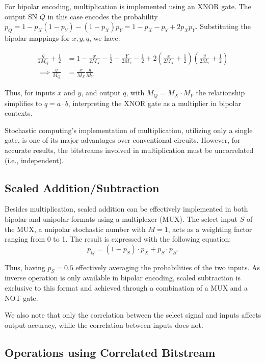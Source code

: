 For bipolar encoding, multiplication is implemented using an XNOR gate. The output SN $Q $ in this case encodes the probability $p_Q  = 1 - p_X (1-p_Y) - (1-p_X) p_Y = 1 - p_X - p_Y + 2p_Xp_Y$. Substituting the bipolar mappings for $x, y, q$, we have: 

$$\begin{aligned} 
\frac{q}{2M_Q} + \frac{1}{2} &= 1 - \frac{x}{2M_X} - \frac{1}{2} - \frac{Y}{2M_Y} - \frac{1}{2} + 2\left(\frac{x}{2M_X} + \frac{1}{2}\right) \left(\frac{y}{2M_Y} + \frac{1}{2}\right) \\
\implies \frac{q}{M_Q} &= \frac{x}{M_X} \frac{y}{M_Y}
\end{aligned}$$

Thus, for inputs $x $ and $y $, and output $q $, with $M_Q = M_X \cdot M_Y$ the relationship simplifies to $q = a \cdot b $, interpreting the XNOR gate as a multiplier in bipolar contexts.

Stochastic computing's implementation of multiplication, utilizing only a single gate, is one of its major advantages over conventional circuits. However, for accurate results, the bitstreams involved in multiplication must be uncorrelated (i.e., independent).

\subsection{Scaled Addition/Subtraction}

Besides multiplication, scaled addition can be effectively implemented in both bipolar and unipolar formats using a multiplexer (MUX). The select input $S $ of the MUX, a unipolar stochastic number with $M = 1 $, acts as a weighting factor ranging from 0 to 1. The result is expressed with the following equation: $$p_Q  = (1 - p_S) \cdot p_X + p_S \cdot p_B .$$ 

Thus, having $p_S = 0.5$ effectively averaging the probabilities of the two inputs. As inverse operation is only available in bipolar encoding, scaled subtraction is exclusive to this format and achieved through a combination of a MUX and a NOT gate. 

We also note that only the correlation between the select signal and inputs affects output accuracy, while the correlation between inputs does not.

\subsection{Operations using Correlated Bitstream}

